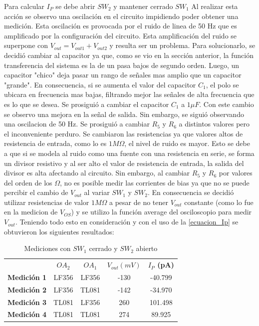 Para calcular $I_{P}$ se debe abrir $SW_2$ y mantener cerrado $SW_1$  Al realizar esta acción se observo una oscilación en el circuito impidiendo poder obtener una medición. Esta oscilación es provocada por el ruido de linea de 50 Hz que es amplificado por la configuración del circuito.
Esta amplificación del ruido se superpone con $V_{out} = V_{out1} + V_{out2}$ y resulta ser un problema. Para solucionarlo, se decidió cambiar al capacitor ya que, como se vio en la sección anterior, la función transferencia del sistema es la de un pasa bajos de segundo orden. 
Luego, un capacitor "chico" deja pasar un rango de señales mas amplio que un capacitor "grande". En consecuencia, si se aumenta el valor del capacitor $C_1$, el polo se 
ubicara en frecuencia mas bajas, filtrando mejor las señales de alta frecuencia que es lo que se desea. Se prosiguió a cambiar el capacitor $C_1$ a $1\mu F$. Con este cambio se observo una mejora en la señal de salida. Sin embargo, se siguió observando una oscilacion de 50 Hz. Se prosiguió a cambiar $R_5$ y $R_6$ a distintos
valores pero el inconveniente perduro. Se cambiaron las resistencias ya que valores altos de resistencia de
entrada, como lo es $1M\Omega$, el nivel de ruido es mayor. Esto se debe a que si se modela al ruido como una fuente con una resistencia en serie, se forma un divisor resistivo y al ser alto el valor de resistencia de entrada, la salida del divisor es alta afectando al circuito. Sin embargo, al cambiar 
$R_5$ y $R_6$ por valores del orden de los $\Omega$, no es posible medir las corrientes de bias ya que no se puede percibir el cambio de $V_{out}$ al variar $SW_1$ y $SW_2$. En consecuencia se decidió utilizar resistencias de valor $1M\Omega$ a pesar de no tener $V_{out}$ constante (como lo fue en la medicion de $V_{OS}$) y se utilizo la función average del osciloscopio
para medir $V_{out}$.
Teniendo todo esto en consideración y con el uso de la \ref{ecuacion_Ip} se obtuvieron los siguientes resultados:


\begin{table}[h!]
    \centering
    \caption{Mediciones con $SW_1$ cerrado y $SW_2$ abierto}
    \label{table3}
    \begin{tabular}{@{}ccccc@{}}
    \textbf{}           & \textbf{$OA_2$} & \textbf{$OA_1$} & \textbf{$V_{out} (mV)$} & \textbf{$I_P$ (pA)} \\ 
    \textbf{Medición 1} & LF356          & LF356          & -130              & -40.799             \\
    \textbf{Medición 2} & LF356          & TL081          & -142              &  -34.970            \\
    \textbf{Medición 3} & TL081          & LF356          & 260              &  101.498            \\
    \textbf{Medición 4} & TL081          & TL081          & 274              & 89.925             \\ 
    \end{tabular}
\end{table}


